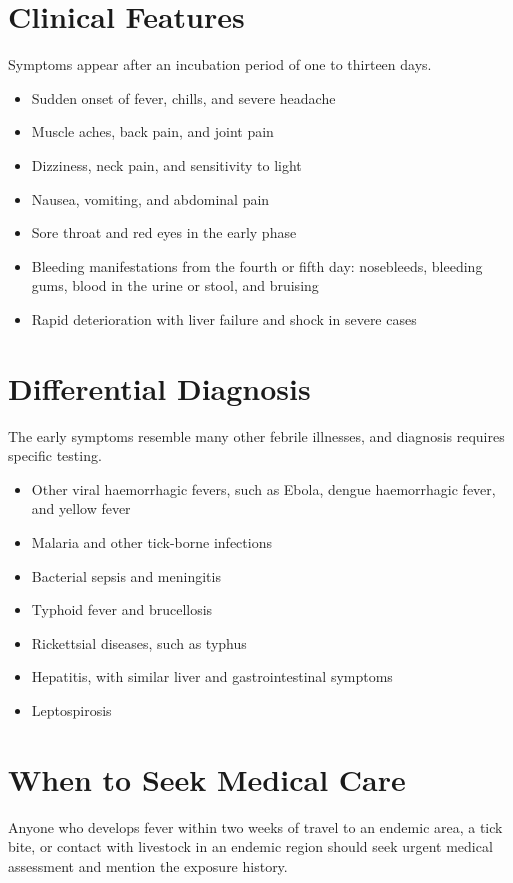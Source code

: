 \section*{Clinical Features}
Symptoms appear after an incubation period of one to thirteen days.

\begin{itemize}
    \item Sudden onset of fever, chills, and severe headache
    \item Muscle aches, back pain, and joint pain
    \item Dizziness, neck pain, and sensitivity to light
    \item Nausea, vomiting, and abdominal pain
    \item Sore throat and red eyes in the early phase
    \item Bleeding manifestations from the fourth or fifth day: nosebleeds, bleeding gums, blood in the urine or stool, and bruising
    \item Rapid deterioration with liver failure and shock in severe cases
\end{itemize}

\section*{Differential Diagnosis}
The early symptoms resemble many other febrile illnesses, and diagnosis requires specific testing.

\begin{itemize}
    \item Other viral haemorrhagic fevers, such as Ebola, dengue haemorrhagic fever, and yellow fever
    \item Malaria and other tick-borne infections
    \item Bacterial sepsis and meningitis
    \item Typhoid fever and brucellosis
    \item Rickettsial diseases, such as typhus
    \item Hepatitis, with similar liver and gastrointestinal symptoms
    \item Leptospirosis
\end{itemize}

\section*{When to Seek Medical Care}
Anyone who develops fever within two weeks of travel to an endemic area, a tick bite, or contact with livestock in an endemic region should seek urgent medical assessment and mention the exposure history.


